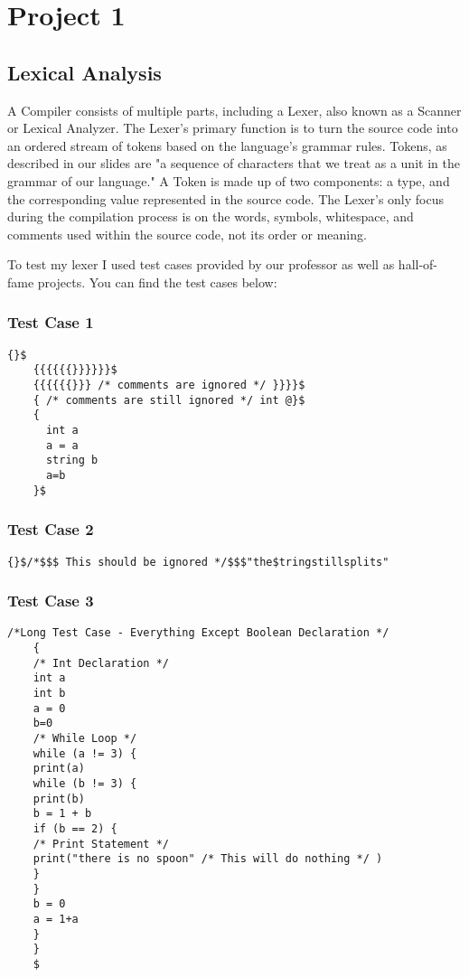 \documentclass[letterpaper, 10pt,DIV=13]{scrartcl}
\numberwithin{equation}{section} %
\numberwithin{figure}{section} %
\numberwithin{table}{section} %
\begin{document}
\section{Project 1}

\subsection{Lexical Analysis}
A Compiler consists of multiple parts, including a Lexer, also known as a Scanner or Lexical Analyzer. The Lexer's primary function is to turn the source code into an ordered stream of tokens based on the language's grammar rules. Tokens, as described in our slides are "a sequence of characters that we treat as a unit in the grammar of our language." A Token is made up of two components: a type, and the corresponding value represented in the source code. The Lexer's only focus during the compilation process is on the words, symbols, whitespace, and comments used within the source code, not its order or meaning.

To test my lexer I used test cases provided by our professor as well as hall-of-fame projects. You can find the test cases below:

\subsubsection*{Test Case 1}
    \lstset{numbers=left, numberstyle=\tiny, stepnumber=1, numbersep=5pt, basicstyle=\footnotesize\ttfamily}
    \begin{lstlisting}[frame=single, ]
    {}$
    {{{{{{}}}}}}$
    {{{{{{}}} /* comments are ignored */ }}}}$
    { /* comments are still ignored */ int @}$
    {
      int a
      a = a
      string b
      a=b
    }$
\end{lstlisting}

\subsubsection*{Test Case 2}
    \lstset{numbers=left, numberstyle=\tiny, stepnumber=1, numbersep=5pt, basicstyle=\footnotesize\ttfamily}
    \begin{lstlisting}[frame=single, ]
    {}$/*$$$ This should be ignored */$$$"the$tringstillsplits"
\end{lstlisting}

\subsubsection*{Test Case 3}
    \lstset{numbers=left, numberstyle=\tiny, stepnumber=1, numbersep=5pt, basicstyle=\footnotesize\ttfamily}
    \begin{lstlisting}[frame=single, ]
    /*Long Test Case - Everything Except Boolean Declaration */
    {
    /* Int Declaration */
    int a
    int b
    a = 0
    b=0
    /* While Loop */
    while (a != 3) {
    print(a)
    while (b != 3) {
    print(b)
    b = 1 + b
    if (b == 2) {
    /* Print Statement */
    print("there is no spoon" /* This will do nothing */ )
    }
    }
    b = 0
    a = 1+a
    }
    }
    $
\end{lstlisting}
\end{document}
